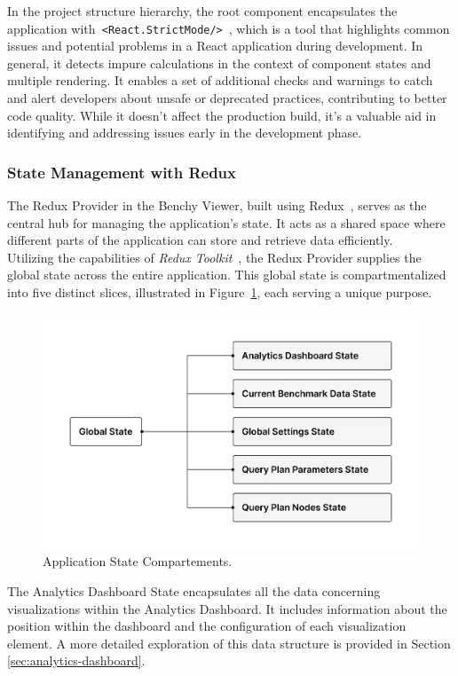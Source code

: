 In the project structure hierarchy, the root component encapsulates the application with\texttt{ <React.StrictMode/>}~\parencite{reactstrictmode}, which is a tool that highlights common issues and potential problems in a React application during development.
In general, it detects impure calculations in the context of component states and multiple rendering. It enables a set of additional checks and warnings to catch and alert developers about unsafe or deprecated practices, contributing to better code quality. While it doesn't affect the production build, it's a valuable aid in identifying and addressing issues early in the development phase.


\subsubsection{State Management with Redux}\label{sec:redux-structure}
The Redux Provider in the Benchy Viewer, built using Redux~\parencite{Redux}, serves as the central hub for managing the application's state. It acts as a shared space where different parts of the application can store and retrieve data efficiently.\\
Utilizing the capabilities of \textit{Redux Toolkit}~\parencite{redux-toolkit}, the Redux Provider supplies the global state across the entire application. This global state is compartmentalized into five distinct slices, illustrated in Figure~\ref{fig:global-state}, each serving a unique purpose.

\begin{figure}[h]
  \centering
  \includegraphics[width=0.8\linewidth]{figures/global-state.png}
  \caption{Application State Compartements.}
  \label{fig:global-state}
\end{figure}

The Analytics Dashboard State encapsulates all the data concerning visualizations within the Analytics Dashboard. It includes information about the position within the dashboard and the configuration of each visualization element. A more detailed exploration of this data structure is provided in Section \ref{sec:analytics-dashboard}.

